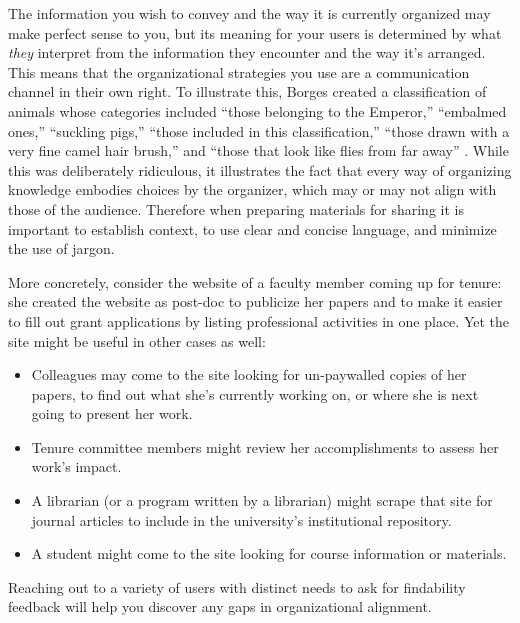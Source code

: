 \documentclass[10pt,letterpaper]{article}
\begin{document}
The information you wish to convey and the way it is currently organized may
make perfect sense to you, but its meaning for your users is determined by what
\emph{they} interpret from the information they encounter and the way it's
arranged. This means that the organizational strategies you use are a
communication channel in their own right. To illustrate this, Borges created a
classification of animals whose categories included ``those belonging to the
Emperor,'' ``embalmed ones,'' ``suckling pigs,'' ``those included in this
classification,'' ``those drawn with a very fine camel hair brush,'' and ``those
that look like flies from far away'' \cite{Borges2000}. While this was
deliberately ridiculous, it illustrates the fact that every way of organizing
knowledge embodies choices by the organizer, which may or may not align with
those of the audience. Therefore when preparing materials for sharing it is
important to establish context, to use clear and concise language, and minimize
the use of jargon.

More concretely, consider the website of a faculty member coming up for tenure:
she created the website as post-doc to publicize her papers and to make it
easier to fill out grant applications by listing professional activities in one
place. Yet the site might be useful in other cases as well:

\begin{itemize}

\item
  Colleagues may come to the site looking for un-paywalled copies of her papers,
  to find out what she's currently working on, or where she is next going to
  present her work.

\item
  Tenure committee members might review her accomplishments to assess her
  work's impact.

\item
  A librarian (or a program written by a librarian) might scrape that site for
  journal articles to include in the university's institutional repository.

\item
  A student might come to the site looking for course information or materials.

\end{itemize}

Reaching out to a variety of users with distinct needs to ask for findability
feedback will help you discover any gaps in organizational alignment.
\end{document}
